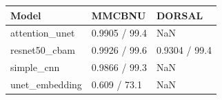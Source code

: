\begin{tabular}{lll}
\toprule
Model & MMCBNU & DORSAL \\
\midrule
attention_unet & 0.9905 / 99.4 & NaN \\
resnet50_cbam & 0.9926 / 99.6 & 0.9304 / 99.4 \\
simple_cnn & 0.9866 / 99.3 & NaN \\
unet_embedding & 0.609 / 73.1 & NaN \\
\bottomrule
\end{tabular}
